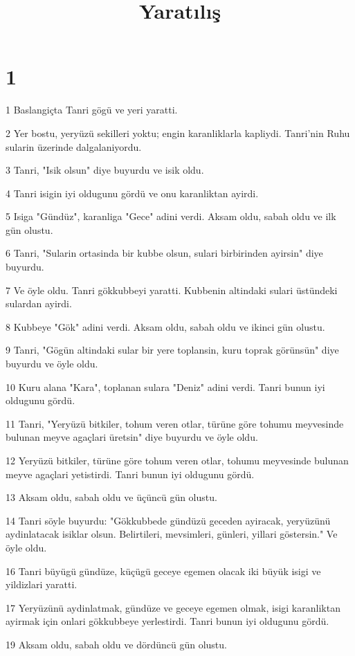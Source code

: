 

\title{Yaratılış}


\chapter{1}

\par 1 Baslangiçta Tanri gögü ve yeri yaratti.
\par 2 Yer bostu, yeryüzü sekilleri yoktu; engin karanliklarla kapliydi. Tanri'nin Ruhu sularin üzerinde dalgalaniyordu.
\par 3 Tanri, "Isik olsun" diye buyurdu ve isik oldu.
\par 4 Tanri isigin iyi oldugunu gördü ve onu karanliktan ayirdi.
\par 5 Isiga "Gündüz", karanliga "Gece" adini verdi. Aksam oldu, sabah oldu ve ilk gün olustu.
\par 6 Tanri, "Sularin ortasinda bir kubbe olsun, sulari birbirinden ayirsin" diye buyurdu.
\par 7 Ve öyle oldu. Tanri gökkubbeyi yaratti. Kubbenin altindaki sulari üstündeki sulardan ayirdi.
\par 8 Kubbeye "Gök" adini verdi. Aksam oldu, sabah oldu ve ikinci gün olustu.
\par 9 Tanri, "Gögün altindaki sular bir yere toplansin, kuru toprak görünsün" diye buyurdu ve öyle oldu.
\par 10 Kuru alana "Kara", toplanan sulara "Deniz" adini verdi. Tanri bunun iyi oldugunu gördü.
\par 11 Tanri, "Yeryüzü bitkiler, tohum veren otlar, türüne göre tohumu meyvesinde bulunan meyve agaçlari üretsin" diye buyurdu ve öyle oldu.
\par 12 Yeryüzü bitkiler, türüne göre tohum veren otlar, tohumu meyvesinde bulunan meyve agaçlari yetistirdi. Tanri bunun iyi oldugunu gördü.
\par 13 Aksam oldu, sabah oldu ve üçüncü gün olustu.
\par 14 Tanri söyle buyurdu: "Gökkubbede gündüzü geceden ayiracak, yeryüzünü aydinlatacak isiklar olsun. Belirtileri, mevsimleri, günleri, yillari göstersin." Ve öyle oldu.
\par 16 Tanri büyügü gündüze, küçügü geceye egemen olacak iki büyük isigi ve yildizlari yaratti.
\par 17 Yeryüzünü aydinlatmak, gündüze ve geceye egemen olmak, isigi karanliktan ayirmak için onlari gökkubbeye yerlestirdi. Tanri bunun iyi oldugunu gördü.
\par 19 Aksam oldu, sabah oldu ve dördüncü gün olustu.
